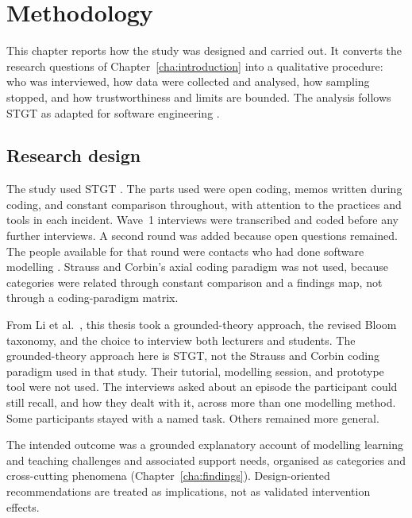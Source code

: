 
%

\chapter{Methodology}
\label{cha:methodology}

This chapter reports how the study was designed and carried out. It converts the research questions of Chapter~\ref{cha:introduction} into a qualitative procedure: who was interviewed, how data were collected and analysed, how sampling stopped, and how trustworthiness and limits are bounded. The analysis follows STGT as adapted for software engineering \cite{hoda2018socio,stol2016grounded}.

\section{Research design}
\label{sec:method_design}

The study used STGT \cite{hoda2018socio}. The parts used were open coding, memos written during coding, and constant comparison throughout, with attention to the practices and tools in each incident. Wave~1 interviews were transcribed and coded before any further interviews. A second round was added because open questions remained. The people available for that round were contacts who had done software modelling \cite{adolph2011using,stol2016grounded}. Strauss and Corbin's axial coding paradigm was not used, because categories were related through constant comparison and a findings map, not through a coding-paradigm matrix.

From Li et al.\ \cite{istar-learning}, this thesis took a grounded-theory approach, the revised Bloom taxonomy, and the choice to interview both lecturers and students. The grounded-theory approach here is STGT, not the Strauss and Corbin coding paradigm used in that study. Their tutorial, modelling session, and prototype tool were not used. The interviews asked about an episode the participant could still recall, and how they dealt with it, across more than one modelling method. Some participants stayed with a named task. Others remained more general.

The intended outcome was a grounded explanatory account of modelling learning and teaching challenges and associated support needs, organised as categories and cross-cutting phenomena (Chapter~\ref{cha:findings}). Design-oriented recommendations are treated as implications, not as validated intervention effects.

